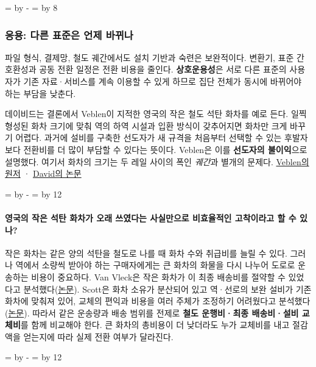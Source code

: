 \documentclass[10pt,a4paper]{article}
\newcommand{\ReserveQuestionSpace}{%
  \par\begingroup
  \dimen0=\pagegoal \advance\dimen0 by -\pagetotal
  \dimen2=\baselineskip \multiply\dimen2 by 12
  \ifdim\dimen0<\dimen2 \newpage\fi
  \endgroup}
\newcommand{\ReserveReadingSectionSpace}{%
  \par\begingroup
  \dimen0=\pagegoal \advance\dimen0 by -\pagetotal
  \dimen2=\baselineskip \multiply\dimen2 by 8
  \ifdim\dimen0<\dimen2 \newpage\fi
  \endgroup}
\begin{document}
\ReserveReadingSectionSpace
\subsubsection*{응용: 다른 표준은 언제 바뀌나}

파일 형식, 결제망, 철도 궤간에서도 설치 기반과 숙련은 보완적이다. 변환기, 표준 간 호환성과 공동 전환 일정은 전환 비용을 줄인다. \textbf{상호운용성}은 서로 다른 표준의 사용자가 기존 자료·서비스를 계속 이용할 수 있게 하므로 집단 전체가 동시에 바뀌어야 하는 부담을 낮춘다.\par

데이비드는 결론에서 Veblen이 지적한 영국의 작은 철도 석탄 화차를 예로 든다. 일찍 형성된 화차 크기에 맞춰 역의 하역 시설과 입환 방식이 갖추어지면 화차만 크게 바꾸기 어렵다. 과거에 설비를 구축한 선도자가 새 규격을 처음부터 선택할 수 있는 후발자보다 전환비를 더 많이 부담할 수 있다는 뜻이다. Veblen은 이를 \textbf{선도자의 불이익}으로 설명했다. 여기서 화차의 크기는 두 레일 사이의 폭인 \emph{궤간}과 별개의 문제다. \href{https://books.google.com/books?id=c\_lhvn2hsuEC}{Veblen의 원저} · \href{https://www.jstor.org/stable/1805621}{David의 논문}\par

\ReserveQuestionSpace
\paragraph{영국의 작은 석탄 화차가 오래 쓰였다는 사실만으로 비효율적인 고착이라고 할 수 있나?}
작은 화차는 같은 양의 석탄을 철도로 나를 때 화차 수와 취급비를 늘릴 수 있다. 그러나 역에서 소량씩 받아야 하는 구매자에게는 큰 화차의 화물을 다시 나누어 도로로 운송하는 비용이 중요하다. Van Vleck은 작은 화차가 이 최종 배송비를 절약할 수 있었다고 분석했다(\href{https://www.cambridge.org/core/product/identifier/S0022050700017952/type/journal\_article}{논문}). Scott은 화차 소유가 분산되어 있고 역·선로의 보완 설비가 기존 화차에 맞춰져 있어, 교체의 편익과 비용을 여러 주체가 조정하기 어려웠다고 분석했다(\href{https://www.sciencedirect.com/science/article/abs/pii/S0014498300907666}{논문}). 따라서 같은 운송량과 배송 범위를 전제로 \textbf{철도 운행비·최종 배송비·설비 교체비}를 함께 비교해야 한다. 큰 화차의 총비용이 더 낮더라도 누가 교체비를 내고 절감액을 얻는지에 따라 실제 전환 여부가 달라진다.\par

\ReserveQuestionSpace
\end{document}
